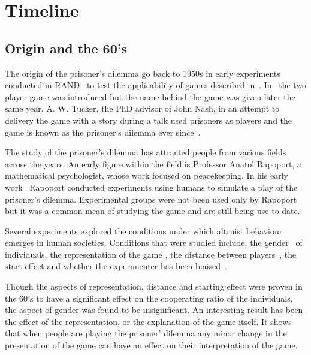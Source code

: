 \documentclass{article}
\begin{document}
\section{Timeline}\label{section:timeline}

\subsection{Origin and the 60's}

The origin of the prisoner's dilemma go back to 1950s in early experiments
conducted in RAND~\cite{Flood1958} to test the applicability of games
described in~\cite{VonNeumann1944}. In~\cite{Flood1958} the two player game was
introduced but the name behind the game was given later the same year. 
A. W. Tucker, the PhD advisor of John Nash, in an attempt to delivery the game
with a story during a talk used prisoners as players and the game is known as 
the prisoner's dilemma ever since~\cite{Tucker1983}.

The study of the prisoner's dilemma has attracted people from various fields
across the years. An early figure within the field is Professor Anatol Rapoport,
a mathematical psychologist, whose work focused on peacekeeping.
In his early work~\cite{rapoport1965} Rapoport conducted experiments using humans
to simulate a play of the prisoner's dilemma. Experimental groups were not been
used only by Rapoport but it was a common mean of studying the game
\cite{Evans1966, Gallo1968, Lutzker1961, Mack1971, Sensenig1972} and are still
being use to date. %

Several experiments explored the conditions under which altruist behaviour emerges
in human societies. Conditions that were studied include, the gender~\cite{Evans1966,
Lutzker1961, Mack1971} of individuals, the representation of the game
\cite{Evans1966}, the distance between players~\cite{Sensenig1972}, the start effect
\cite{Tedeschi1968} and whether the experimenter has been biaised~\cite{Gallo1968}.

Though the aspects of representation, distance and starting effect were proven 
in the 60's to have a significant effect on the cooperating ratio of the 
individuals, the aspect of gender was found to be insignificant. An interesting
result has been the effect of the representation, or the  explanation of the game 
itself. It shows that when people are playing the prisoner' dilemma 
any minor change in the presentation of the game can have an effect on their
interpretation of the game. 
\end{document}
